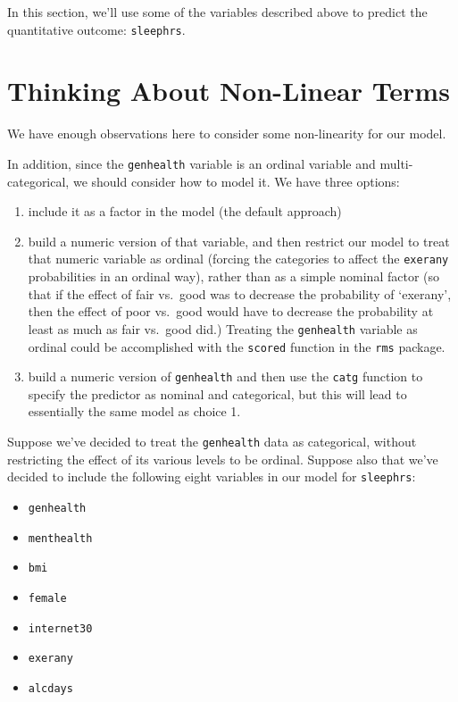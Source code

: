 \documentclass[]{book}
\providecommand{\tightlist}{%
  \setlength{\itemsep}{0pt}\setlength{\parskip}{0pt}}
\theoremstyle{definition}
\theoremstyle{definition}
\theoremstyle{definition}
\theoremstyle{remark}
\begin{document}
In this section, we'll use some of the variables described above to
predict the quantitative outcome: \texttt{sleephrs}.

\section{Thinking About Non-Linear
Terms}\label{thinking-about-non-linear-terms-1}

We have enough observations here to consider some non-linearity for our
model.

In addition, since the \texttt{genhealth} variable is an ordinal
variable and multi-categorical, we should consider how to model it. We
have three options:

\begin{enumerate}
\def\labelenumi{\arabic{enumi}.}
\tightlist
\item
  include it as a factor in the model (the default approach)
\item
  build a numeric version of that variable, and then restrict our model
  to treat that numeric variable as ordinal (forcing the categories to
  affect the \texttt{exerany} probabilities in an ordinal way), rather
  than as a simple nominal factor (so that if the effect of fair
  vs.~good was to decrease the probability of `exerany', then the effect
  of poor vs.~good would have to decrease the probability at least as
  much as fair vs.~good did.) Treating the \texttt{genhealth} variable
  as ordinal could be accomplished with the \texttt{scored} function in
  the \texttt{rms} package.
\item
  build a numeric version of \texttt{genhealth} and then use the
  \texttt{catg} function to specify the predictor as nominal and
  categorical, but this will lead to essentially the same model as
  choice 1.
\end{enumerate}

Suppose we've decided to treat the \texttt{genhealth} data as
categorical, without restricting the effect of its various levels to be
ordinal. Suppose also that we've decided to include the following eight
variables in our model for \texttt{sleephrs}:

\begin{itemize}
\tightlist
\item
  \texttt{genhealth}
\item
  \texttt{menthealth}
\item
  \texttt{bmi}
\item
  \texttt{female}
\item
  \texttt{internet30}
\item
  \texttt{exerany}
\item
  \texttt{alcdays}
\end{itemize}
\end{document}
